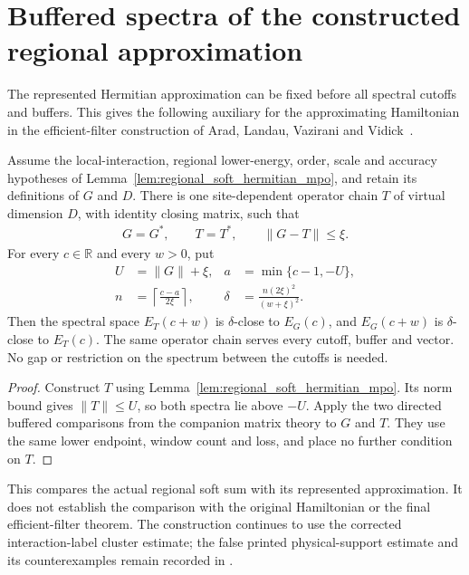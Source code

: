 \section{Buffered spectra of the constructed regional approximation}
\label{sec:regional_soft_spectral}

The represented Hermitian approximation can be fixed before all spectral
cutoffs and buffers. This gives the following auxiliary for the
approximating Hamiltonian in the efficient-filter construction of
Arad, Landau, Vazirani and Vidick~\cite[lines 1412--1420 and 1446--1457]{Arad2016RigorousRG}.

\begin{lemma}
    \label{lem:regional_soft_mpo_buffered_spectra}
    \leanok
    Assume the local-interaction, regional lower-energy, order, scale and
    accuracy hypotheses of Lemma~\ref{lem:regional_soft_hermitian_mpo},
    and retain its definitions of $G$ and $D$.
    There is one site-dependent operator chain $T$ of virtual dimension
    $D$, with identity closing matrix, such that
    \begin{align}
        G=G^*,\qquad T=T^*,\qquad\|G-T\|\leq\xi.
    \end{align}
    For every $c\in\mathbb R$ and every $w>0$, put
    \begin{align}
        U      & =\|G\|+\xi,                               & a & =\min\{c-1,-U\}, \\
        n      & =\left\lceil\frac{c-a}{2\xi}\right\rceil, &
        \delta & =\frac{n(2\xi)^2}{(w+\xi)^2}.
    \end{align}
    Then the spectral space $E_T(c+w)$ is $\delta$-close to $E_G(c)$,
    and $E_G(c+w)$ is $\delta$-close to $E_T(c)$.
    The same operator chain serves every cutoff, buffer and vector.
    No gap or restriction on the spectrum between the cutoffs is needed.
\end{lemma}
\begin{proof}\leanok
    Construct $T$ using Lemma~\ref{lem:regional_soft_hermitian_mpo}.
    Its norm bound gives $\|T\|\leq U$, so both spectra lie above $-U$.
    Apply the two directed buffered comparisons from the companion
    matrix theory to $G$ and $T$. They use the same lower endpoint,
    window count and loss, and place no further condition on $T$.
\end{proof}

This compares the actual regional soft sum with its represented
approximation. It does not establish the comparison with the original
Hamiltonian or the final efficient-filter theorem. The construction
continues to use the corrected interaction-label cluster estimate;
the false printed physical-support estimate and its counterexamples
remain recorded in \cite{gap:alvv16_cluster_approximation}.
